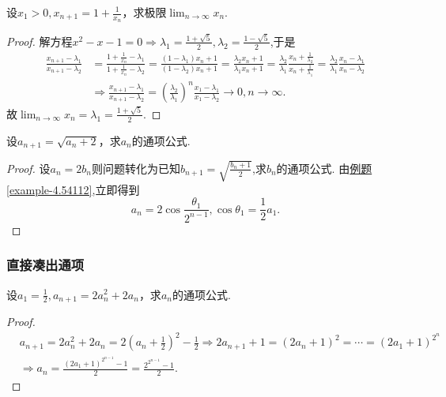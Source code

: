 \documentclass[../../main.tex]{subfiles}%
\begin{document}
\begin{example}
设\(x_1 > 0,x_{n + 1}=1+\frac{1}{x_n}\)，求极限\(\lim_{n\rightarrow\infty}x_n\).
\end{example}
\begin{proof}
解方程\(x^2 - x - 1 = 0\Rightarrow\lambda_1=\frac{1 + \sqrt{5}}{2},\lambda_2=\frac{1 - \sqrt{5}}{2}\),于是
\begin{align*}
\frac{x_{n + 1}-\lambda_1}{x_{n + 1}-\lambda_2}&=\frac{1+\frac{1}{x_n}-\lambda_1}{1+\frac{1}{x_n}-\lambda_2}=\frac{(1 - \lambda_1)x_n + 1}{(1 - \lambda_2)x_n + 1}=\frac{\lambda_2x_n + 1}{\lambda_1x_n + 1}=\frac{\lambda_2}{\lambda_1}\frac{x_n+\frac{1}{\lambda_2}}{x_n+\frac{1}{\lambda_1}}=\frac{\lambda_2}{\lambda_1}\frac{x_n-\lambda_1}{x_n-\lambda_2}\\
&\Rightarrow\frac{x_{n + 1}-\lambda_1}{x_{n + 1}-\lambda_2}=\left(\frac{\lambda_2}{\lambda_1}\right)^n\frac{x_1-\lambda_1}{x_1-\lambda_2}\to 0,n\to \infty.
\end{align*}
故$\lim_{n\rightarrow\infty}x_n=\lambda_1=\frac{1 + \sqrt{5}}{2}.$
\end{proof}

\begin{example}
设\(a_{n + 1}=\sqrt{a_n + 2}\)，求\(a_n\)的通项公式.
\end{example}
\begin{proof}
设\(a_n = 2b_n\)则问题转化为已知$b_{n+1}=\sqrt{\frac{b_n+1}{2}}$,求$b_n$的通项公式.
由\hyperref[example-4.54112]{例题\ref{example-4.54112}},立即得到\[a_n = 2\cos\frac{\theta_1}{2^{n - 1}},\cos\theta_1=\frac{1}{2}a_1.\]
\end{proof}


\subsubsection{直接凑出通项}

\begin{example}
设\(a_1=\frac{1}{2},a_{n + 1}=2a_n^2 + 2a_n\)，求\(a_n\)的通项公式.
\end{example}
\begin{proof}
\begin{align*}
&a_{n + 1}=2a_n^2 + 2a_n = 2\left(a_n+\frac{1}{2}\right)^2-\frac{1}{2}\Rightarrow 2a_{n + 1}+1=(2a_n + 1)^2=\cdots=(2a_1 + 1)^{2^n}\\
&\Rightarrow a_n=\frac{(2a_1 + 1)^{2^{n - 1}}-1}{2}=\frac{2^{2^{n - 1}}-1}{2}.
\end{align*}
\end{proof}
\end{document}
